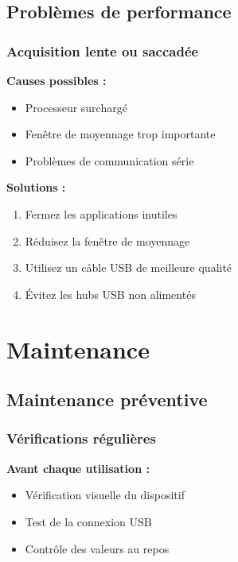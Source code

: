 \documentclass[12pt,a4paper]{article}
\begin{document}
\subsection{Problèmes de performance}

\subsubsection{Acquisition lente ou saccadée}

\textbf{Causes possibles :}
\begin{itemize}
    \item Processeur surchargé
    \item Fenêtre de moyennage trop importante
    \item Problèmes de communication série
\end{itemize}

\textbf{Solutions :}
\begin{enumerate}
    \item Fermez les applications inutiles
    \item Réduisez la fenêtre de moyennage
    \item Utilisez un câble USB de meilleure qualité
    \item Évitez les hubs USB non alimentés
\end{enumerate}

\section{Maintenance}

\subsection{Maintenance préventive}

\subsubsection{Vérifications régulières}

\textbf{Avant chaque utilisation :}
\begin{itemize}
    \item Vérification visuelle du dispositif
    \item Test de la connexion USB
    \item Contrôle des valeurs au repos
\end{itemize}
\end{document}
